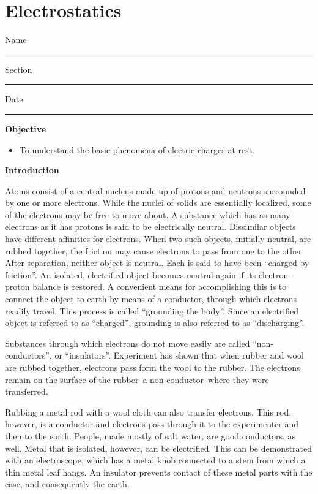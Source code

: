 
\section{Electrostatics}

Name \rule{2.0in}{0.1pt}\hfill{}Section \rule{1.0in}{0.1pt}\hfill{}Date
\rule{1.0in}{0.1pt}

\textbf{Objective}

\begin{itemize}
\item To understand the basic phenomena of electric charges at rest.
\end{itemize}
\textbf{Introduction}

Atoms consist of a central nucleus made up of protons and neutrons
surrounded by one or more electrons. While the nuclei of solids are
essentially localized, some of the electrons may be free to move about.
A substance which has as many electrons as it has protons is said
to be electrically neutral. Dissimilar objects have different affinities
for electrons. When two such objects, initially neutral, are rubbed
together, the friction may cause electrons to pass from one to the
other. After separation, neither object is neutral. Each is said to
have been {}``charged by friction''. An isolated, electrified object
becomes neutral again if its electron-proton balance is restored.
A convenient means for accomplishing this is to connect the object
to earth by means of a conductor, through which electrons readily
travel. This process is called {}``grounding the body''. Since an
electrified object is referred to as {}``charged'', grounding is
also referred to as {}``discharging''.

Substances through which electrons do not move easily are called {}``non-conductors'',
or {}``insulators''. Experiment has shown that when rubber and wool
are rubbed together, electrons pass form the wool to the rubber. The
electrons remain on the surface of the rubber--a non-conductor--where
they were transferred.

Rubbing a metal rod with a wool cloth can also transfer electrons.
This rod, however, is a conductor and electrons pass through it to
the experimenter and then to the earth. People, made mostly of salt
water, are good conductors, as well. Metal that is isolated, however,
can be electrified. This can be demonstrated with an electroscope,
which has a metal knob connected to a stem from which a thin metal
leaf hangs. An insulator prevents contact of these metal parts with
the case, and consequently the earth.

